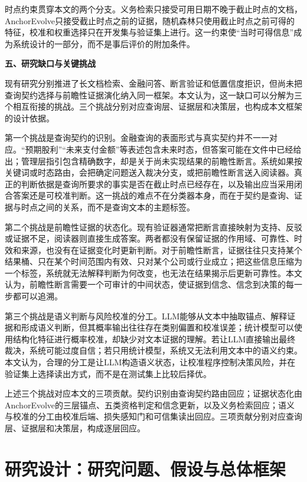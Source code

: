 时点约束贯穿本文的两个分支。义务检索只接受可用日期不晚于截止时点的文档，AnchorEvolve只接受截止时点之前的证据，随机森林只使用截止时点之前可得的特征，校准和权重选择只在开发集与验证集上进行。这一约束使“当时可得信息”成为系统设计的一部分，而不是事后评价的附加条件。

\noindent\textbf{五、研究缺口与关键挑战}

现有研究分别推进了长文档检索、金融问答、断言验证和低置信度拒识，但尚未把查询契约选择与前瞻性证据演化纳入同一框架。本文认为，这一缺口可以分解为三个相互衔接的挑战。三个挑战分别对应查询层、证据层和决策层，也构成本文框架的设计依据。

第一个挑战是查询契约的识别。金融查询的表面形式与真实契约并不一一对应。“预期股利”“未来支付金额”等表述包含未来时态，但答案可能在文件中已经给出；管理层指引包含精确数字，却是关于尚未实现结果的前瞻性断言。系统如果按关键词或时态路由，会把确定问题送入裁决分支，或把前瞻性断言送入阅读器。真正的判断依据是查询所要求的事实是否在截止时点已经存在，以及输出应当采用闭合答案还是可校准判断。这一挑战的难点不在分类器本身，而在于契约是查询、证据与时点之间的关系，而不是查询文本的主题标签。

第二个挑战是前瞻性证据的状态化。现有验证器通常把断言直接映射为支持、反驳或证据不足，阅读器则直接生成答案。两者都没有保留证据的作用域、可靠性、时效和来源，也没有在证据变化时更新判断。对于前瞻性断言，证据往往只支持某个结果桶、只在某个时间范围内有效、只对某个公司或行业成立；把这些信息压缩为一个标签，系统就无法解释判断为何改变，也无法在结果揭示后更新可靠性。本文认为，前瞻性断言需要一个可审计的中间状态，使证据到信念、信念到决策的每一步都可以追溯。

第三个挑战是语义判断与风险校准的分工。LLM能够从文本中抽取锚点、解释证据和形成语义判断，但其概率输出往往存在类别偏置和校准误差；统计模型可以使用结构化特征进行概率校准，却缺少对文本证据的理解。若让LLM直接输出最终裁决，系统可能过度自信；若只用统计模型，系统又无法利用文本中的语义约束。本文认为，合理的分工是让LLM构造语义状态，让校准程序控制决策风险，并在验证集上选择读出方式，而不是在测试集上比较后择优。

上述三个挑战对应本文的三项贡献。契约识别由查询契约路由回应；证据状态化由AnchorEvolve的三层锚点、五类资格判定和信念更新，以及义务检索回应；语义与校准的分工由校准后端、损失感知门和可信集读出回应。三项贡献分别对应查询层、证据层和决策层，构成逐层回应。

\chapter{研究设计：研究问题、假设与总体框架}
\label{ch:framework}

